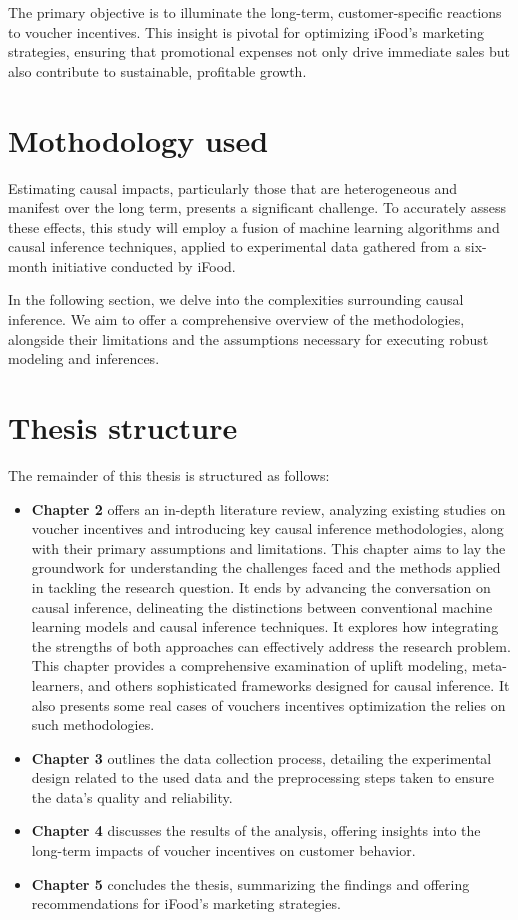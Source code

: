 The primary objective is to illuminate the long-term, customer-specific reactions to voucher incentives. This insight
is pivotal for optimizing iFood's marketing strategies, ensuring that promotional expenses not only drive immediate 
sales but also contribute to sustainable, profitable growth.

\section{Mothodology used}
\label{sub:methodoly}

Estimating causal impacts, particularly those that are heterogeneous and manifest over the long term, presents a 
significant challenge. To accurately assess these effects, this study will employ a fusion of machine learning 
algorithms and causal inference techniques, applied to experimental data gathered from a six-month initiative 
conducted by iFood.

In the following section, we delve into the complexities surrounding causal inference. We aim to offer a comprehensive
overview of the methodologies, alongside their limitations and the assumptions necessary for executing robust modeling
and inferences.

\section{Thesis structure}

The remainder of this thesis is structured as follows:

\begin{itemize}
  \item \textbf{Chapter 2} offers an in-depth literature review, analyzing existing studies on voucher incentives and
  introducing key causal inference methodologies, along with their primary assumptions and limitations. This chapter 
  aims to lay the groundwork for understanding the challenges faced and the methods applied in tackling the research 
  question. It ends by advancing the conversation on causal inference, delineating the distinctions between 
  conventional machine learning models and causal inference techniques. It explores how integrating the strengths 
  of both approaches can effectively address the research problem. This chapter provides a comprehensive examination 
  of uplift modeling, meta-learners, and others sophisticated frameworks designed for causal inference. It also presents
  some real cases of vouchers incentives optimization the relies on such methodologies.
  \item \textbf{Chapter 3} outlines the data collection process, detailing the experimental design related to the used data 
  and the preprocessing steps taken to ensure the data's quality and reliability.
  \item \textbf{Chapter 4} discusses the results of the analysis, offering insights into the long-term impacts of 
  voucher incentives on customer behavior.
  \item \textbf{Chapter 5} concludes the thesis, summarizing the findings and offering recommendations for iFood's 
  marketing strategies.

\end{itemize}


